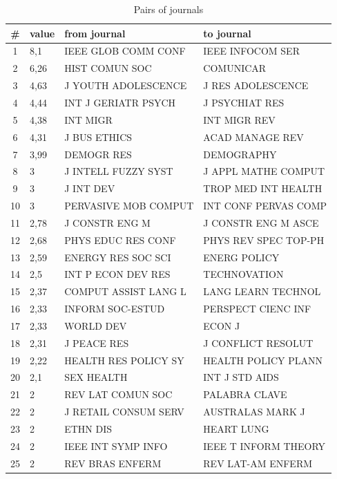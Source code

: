 \documentclass[11pt]{article} %
\begin{document}
\begin{table}
\caption{Pairs of journals} \label{jpairs}\medskip
\renewcommand{\arraystretch}{0.9}
\small
\begin{center}
\begin{tabular}{c|l|p{5cm}|p{5cm}|}
\# &	value &	from journal  &	to journal \\  \hline 
1&	8,1&	IEEE GLOB COMM CONF&	IEEE INFOCOM SER\\
2&	6,26&	HIST COMUN SOC&	COMUNICAR\\
3&	4,63&	J YOUTH ADOLESCENCE&	J RES ADOLESCENCE\\
4&	4,44&	INT J GERIATR PSYCH&	J PSYCHIAT RES\\
5&	4,38&	INT MIGR&	INT MIGR REV\\
6&	4,31&	J BUS ETHICS&	ACAD MANAGE REV\\
7&	3,99&	DEMOGR RES&	DEMOGRAPHY\\
8&	3&	J INTELL FUZZY SYST&	J APPL MATHE COMPUT\\
9&	3&	J INT DEV&	TROP MED INT HEALTH\\
10&	3&	PERVASIVE MOB COMPUT&	INT CONF PERVAS COMP\\
11&	2,78&	J CONSTR ENG M&	J CONSTR ENG M ASCE\\
12&	2,68&	PHYS EDUC RES CONF&	PHYS REV SPEC TOP-PH\\
13&	2,59&	ENERGY RES SOC SCI&	ENERG POLICY\\
14&	2,5&	INT P ECON DEV RES&	TECHNOVATION\\
15&	2,37&	COMPUT ASSIST LANG L&	LANG LEARN TECHNOL\\
16&	2,33&	INFORM SOC-ESTUD&	PERSPECT CIENC INF\\
17&	2,33&	WORLD DEV&	ECON J\\
18&	2,31&	J PEACE RES&	J CONFLICT RESOLUT\\
19&	2,22&	HEALTH RES POLICY SY&	HEALTH POLICY PLANN\\
20&	2,1&	SEX HEALTH&	INT J STD AIDS\\
21&	2&	REV LAT COMUN SOC&	PALABRA CLAVE\\
22&	2&	J RETAIL CONSUM SERV&	AUSTRALAS MARK J\\
23&	2&	ETHN DIS&	HEART LUNG\\
24&	2&	IEEE INT SYMP INFO&	IEEE T INFORM THEORY\\
25&	2&	REV BRAS ENFERM&	REV LAT-AM ENFERM\\ \hline 
\end{tabular}
\end{center}
\end{table}  
\end{document}
